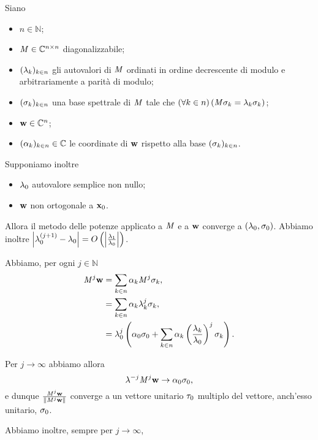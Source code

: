 \begin{Theorem}
  Siano
  \begin{itemize}
    \item $n \in \mathbb{N}$;
    \item $\mathit{M} \in \mathbb{C}^{n \times n}$ diagonalizzabile;
    \item $(\lambda_k)_{k \in n}$ gli autovalori di $\mathit{M}$ ordinati in ordine
      decrescente di modulo e arbitrariamente a parit\`a di modulo;
    \item $(\sigma_k)_{k \in n}$ una base spettrale di $\mathit{M}$ tale
      che $\left ( \forall k \in n \right ) \left ( \mathit{M} \sigma_k = \lambda_k \sigma_k \right )$;
    \item $\mathbf{w} \in \mathbb{C}^n$;
    \item $(\alpha_k)_{k \in n} \in \mathbb{C}$ le coordinate di $\mathbf{w}$
      rispetto alla base $(\sigma_k)_{k \in n}$.
  \end{itemize}
  Supponiamo inoltre
  \begin{itemize}
    \item $\lambda_0$ autovalore semplice non nullo;
    \item $\mathbf{w}$ non ortogonale a $\Eigenvector_0$.
  \end{itemize}
  Allora il metodo delle potenze applicato a $\mathit{M}$ e a $\mathbf{w}$
  converge a $(\lambda_0,\sigma_0)$.
  Abbiamo inoltre
  $\left \lvert \lambda_0^{(j + 1)} - \lambda_0 \right \rvert
  = O \left ( \left \lvert \frac{\lambda_1}{\lambda_0} \right \rvert \right )$.
\end{Theorem}
\Proof Abbiamo, per ogni $j \in \mathbb{N}$
\begin{align*}
  \mathit{M}^j \mathbf{w}
  &= \sum_{k \in n} \alpha_k \mathit{M}^j \sigma_k,\\
  &= \sum_{k \in n} \alpha_k \lambda_k^j \sigma_k,\\
  &= \lambda_0^j \left ( \alpha_0 \sigma_0
    +  \sum_{k \in n} \alpha_k
                      \left ( \frac{\lambda_k}{\lambda_0} \right )^j
                      \sigma_k \right ).
\end{align*}
\par Per $j \rightarrow \infty$ abbiamo allora
\[
  \lambda^{-j}\mathit{M}^j \mathbf{w} \rightarrow \alpha_0 \sigma_0,
\]
e dunque
$\frac{\Matrix^j \VarVector}{\Norm{\Matrix^j \VarVector}}$ converge a un vettore
unitario $\tau_0$ multiplo del vettore, anch'esso unitario,
$\sigma_0$.
\par Abbiamo inoltre, sempre per $j \rightarrow \infty$,
